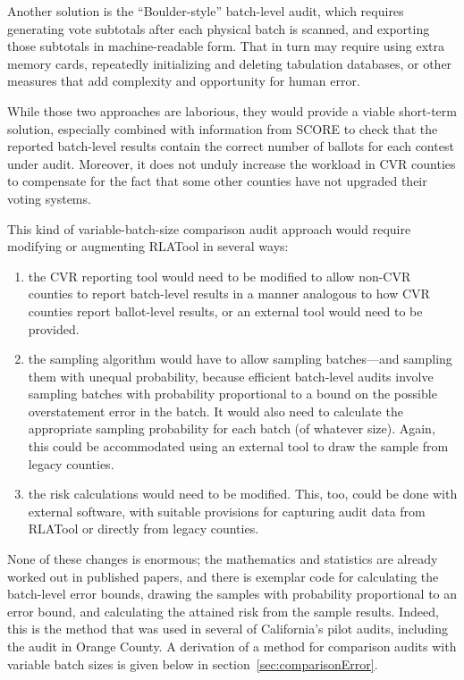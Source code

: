 \documentclass[12pt]{article}
\begin{document}
Another solution is the ``Boulder-style'' batch-level audit, which requires generating 
vote subtotals after each physical batch is scanned, and exporting those subtotals in machine-readable form.
That in turn may require using extra memory cards, repeatedly initializing and deleting tabulation databases,
or other measures that add complexity and opportunity for human error.

While those two approaches are laborious, they would provide a viable short-term solution,
especially combined with information from SCORE to check that the reported batch-level results contain the correct number of ballots for each contest under audit.
Moreover, it does not unduly increase the workload in CVR counties
to compensate for the fact that some other counties have not upgraded their voting
systems.

This kind of variable-batch-size comparison audit approach would require modifying or augmenting
RLATool in several ways: 

\begin{enumerate}

  \item the CVR reporting tool would need to be modified to allow non-CVR counties to
report batch-level results in a manner analogous to how CVR counties report
ballot-level results, or an external tool would need to be provided.

  \item the sampling
algorithm would have to allow sampling batches---and sampling them with unequal probability,
because efficient batch-level audits involve sampling batches with probability proportional
to a bound on the possible overstatement error in the batch.
It would also need to calculate the appropriate sampling probability for each batch (of whatever size).
Again, this could be accommodated using an external tool to draw the sample from legacy counties.

  \item the risk calculations would need to be modified. 
This, too, could be done with external software, with suitable provisions for capturing audit data
from RLATool or directly from legacy counties.
\end{enumerate}

None of these changes is enormous; the mathematics and statistics are already worked out
in published papers, and there is exemplar code for calculating the
batch-level error bounds, drawing the samples with probability proportional to an
error bound, and calculating the attained risk from the sample results.
Indeed, this is the method that was used in several of California's pilot audits,
including the audit in Orange County.
A derivation of a method for comparison audits with variable batch sizes is given below
in section~\ref{sec:comparisonError}.
\end{document}
